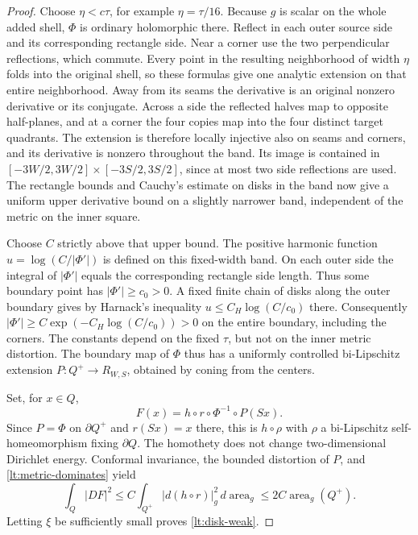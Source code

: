 \documentclass[11pt]{article}
\numberwithin{equation}{section}
\theoremstyle{definition}
\theoremstyle{remark}
\begin{document}
\begin{proof}
Choose $\eta<c\tau$, for example $\eta=\tau/16$.
Because $g$ is scalar on the whole added shell, $\Phi$ is ordinary
holomorphic there.  Reflect in each outer source side and its
corresponding rectangle side.  Near a corner use the two perpendicular
reflections, which commute.  Every point in the resulting neighborhood
of width $\eta$ folds into the original shell, so these formulas give
one analytic extension on that entire neighborhood.  Away from its
seams the derivative is an original nonzero derivative or its conjugate.
Across a side the reflected halves map to opposite half-planes, and
at a corner the four copies map into the four distinct target
quadrants.  The extension is therefore locally injective also on
seams and corners, and its derivative is nonzero throughout the band.
Its image is contained in
$[-3W/2,3W/2]\times[-3S/2,3S/2]$, since at most two side reflections
are used.  The rectangle bounds and Cauchy's estimate on disks in the
band now give a uniform upper derivative bound on a slightly narrower
band, independent of the metric on the inner square.

Choose $C$ strictly above that upper bound.  The positive harmonic
function $u=\log(C/|\Phi'|)$ is defined on this fixed-width band.
On each outer side the integral of $|\Phi'|$ equals the corresponding
rectangle side length.  Thus some boundary point has
$|\Phi'|\geq c_0>0$.  A fixed finite chain of disks along the outer
boundary gives by Harnack's inequality
$u\leq C_H\log(C/c_0)$ there.  Consequently
$|\Phi'|\geq C\exp(-C_H\log(C/c_0))>0$ on the entire boundary,
including the corners.  The constants depend on the fixed $\tau$,
but not on the inner metric distortion.  The boundary map of
$\Phi$ thus has a uniformly controlled bi-Lipschitz extension
$P:Q^+\to R_{W,S}$, obtained by coning from the centers.

Set, for $x\in Q$,
\[
 F(x)=h\circ r\circ\Phi^{-1}\circ P(Sx).
\]
Since $P=\Phi$ on $\partial Q^+$ and $r(Sx)=x$ there, this is
$h\circ\rho$ with $\rho$ a bi-Lipschitz self-homeomorphism fixing
$\partial Q$.  The homothety does not change two-dimensional
Dirichlet energy.  Conformal invariance, the bounded distortion of
$P$, and \eqref{lt:metric-dominates} yield
\[
 \int_Q|DF|^2
 \leq C\int_{Q^+}|d(h\circ r)|_g^2\,d\operatorname{area}_g
 \leq 2C\operatorname{area}_g(Q^+).
\]
Letting $\xi$ be sufficiently small proves \eqref{lt:disk-weak}.


\end{proof}
\end{document}
